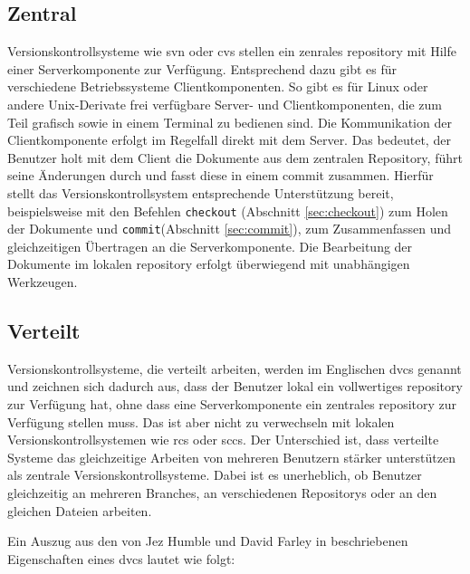 \subsection{Zentral}\label{sec:central}
Versionskontrollsysteme wie \acrshort{svn} oder \acrshort{cvs} stellen ein
zenrales \gls{repository} mit Hilfe einer Serverkomponente zur Verfügung.
Entsprechend dazu gibt es für verschiedene Betriebssysteme Clientkomponenten.
So gibt es für Linux oder andere Unix-Derivate frei verfügbare Server- und
Clientkomponenten, die zum Teil grafisch sowie in einem Terminal zu bedienen
sind. Die Kommunikation der Clientkomponente erfolgt im Regelfall direkt mit
dem Server. Das bedeutet, der Benutzer holt mit dem Client die Dokumente aus
dem zentralen Repository, führt seine Änderungen durch und fasst diese in einem
\gls{commit} zusammen. Hierfür stellt das Versionskontrollsystem entsprechende
Unterstützung bereit, beispielsweise mit den Befehlen \texttt{checkout}
(Abschnitt \ref{sec:checkout}) zum Holen der Dokumente und
\texttt{commit}(Abschnitt \ref{sec:commit}), zum Zusammenfassen und
gleichzeitigen Übertragen an die Serverkomponente. Die Bearbeitung der
Dokumente im lokalen \gls{repository} erfolgt überwiegend mit unabhängigen
Werkzeugen. \cite[S.~38-40]{hagen:1678}

\subsection{Verteilt}\label{sec:decentral}
Versionskontrollsysteme, die verteilt arbeiten, werden im Englischen
\acrfull{dvcs} genannt und zeichnen sich dadurch aus, dass der Benutzer lokal
ein vollwertiges \gls{repository} zur Verfügung hat, ohne dass eine
Serverkomponente ein zentrales \gls{repository} zur Verfügung stellen muss. Das
ist aber nicht zu verwechseln mit lokalen Versionskontrollsystemen wie
\acrshort{rcs} oder \acrshort{sccs}. Der Unterschied ist, dass verteilte
Systeme das gleichzeitige Arbeiten von mehreren Benutzern stärker unterstützen als
zentrale Versionskontrollsysteme. Dabei ist es unerheblich, ob Benutzer gleichzeitig
an mehreren Branches, an verschiedenen Repositorys oder an den gleichen
Dateien arbeiten. \cite[S.~393-394]{cd}

Ein Auszug aus den von Jez Humble und David Farley in \cite[S.~393-394]{cd}
beschriebenen Eigenschaften eines \acrshort{dvcs} lautet wie folgt:

